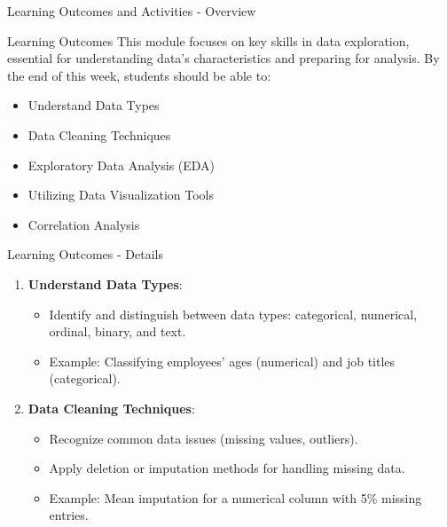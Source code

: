 \documentclass[aspectratio=169]{beamer}
\begin{document}
\begin{frame}[fragile]{Learning Outcomes and Activities - Overview}
    \begin{block}{Learning Outcomes}
        This module focuses on key skills in data exploration, essential for understanding data's characteristics and preparing for analysis. By the end of this week, students should be able to:
    \end{block}
    
    \begin{itemize}
        \item Understand Data Types
        \item Data Cleaning Techniques
        \item Exploratory Data Analysis (EDA)
        \item Utilizing Data Visualization Tools
        \item Correlation Analysis
    \end{itemize}
\end{frame}

\begin{frame}[fragile]{Learning Outcomes - Details}
    \begin{enumerate}
        \item \textbf{Understand Data Types}:
            \begin{itemize}
                \item Identify and distinguish between data types: categorical, numerical, ordinal, binary, and text.
                \item Example: Classifying employees' ages (numerical) and job titles (categorical).
            \end{itemize}
        
        \item \textbf{Data Cleaning Techniques}:
            \begin{itemize}
                \item Recognize common data issues (missing values, outliers).
                \item Apply deletion or imputation methods for handling missing data.
                \item Example: Mean imputation for a numerical column with 5\% missing entries.
            \end{itemize}
    \end{enumerate}
\end{frame}
\end{document}
